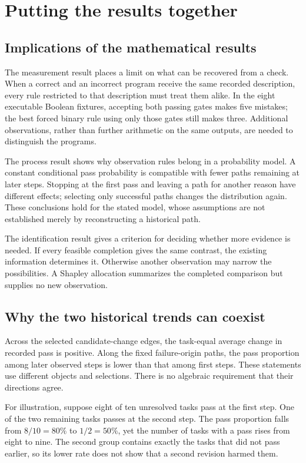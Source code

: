 \section{Putting the results together}
\label{sec:discussion}
\subsection{Implications of the mathematical results}
\label{subsec:implications}
The measurement result places a limit on what can be recovered from a check. When a correct and an incorrect program receive the same recorded description, every rule restricted to that description must treat them alike. In the eight executable Boolean fixtures, accepting both passing gates makes five mistakes; the best forced binary rule using only those gates still makes three. Additional observations, rather than further arithmetic on the same outputs, are needed to distinguish the programs.

The process result shows why observation rules belong in a probability model. A constant conditional pass probability is compatible with fewer paths remaining at later steps. Stopping at the first pass and leaving a path for another reason have different effects; selecting only successful paths changes the distribution again. These conclusions hold for the stated model, whose assumptions are not established merely by reconstructing a historical path.

The identification result gives a criterion for deciding whether more evidence is needed. If every feasible completion gives the same contrast, the existing information determines it. Otherwise another observation may narrow the possibilities. A Shapley allocation summarizes the completed comparison but supplies no new observation.

\subsection{Why the two historical trends can coexist}
\label{subsec:two-trends}
Across the selected candidate-change edges, the task-equal average change in recorded pass is positive. Along the fixed failure-origin paths, the pass proportion among later observed steps is lower than that among first steps. These statements use different objects and selections. There is no algebraic requirement that their directions agree.

For illustration, suppose eight of ten unresolved tasks pass at the first step. One of the two remaining tasks passes at the second step. The pass proportion falls from $8/10=80\%$ to $1/2=50\%$, yet the number of tasks with a pass rises from eight to nine. The second group contains exactly the tasks that did not pass earlier, so its lower rate does not show that a second revision harmed them.

